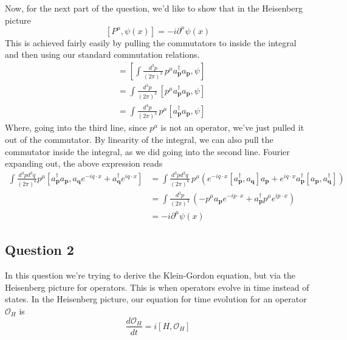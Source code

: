 \documentclass[11pt, oneside]{article}   	%
\theoremstyle{newline}
\theoremstyle{newline}
\theoremstyle{newline}
\theoremstyle{newline}
\theoremstyle{newline}
\begin{document}
Now, for the next part of the question, we'd like to show that in the Heisenberg picture \[ [ P^\mu, \psi(x) ] =  - i \partial^\mu \psi( x) \] 
This is achieved fairly easily by pulling the commutators to inside the integral and then using our standard commutation relations. 
\begin{align*} 
[P^\mu, \psi(x) ] & = [ \int \frac{d^3 p }{ (2 \pi )^3 } \,  p^\mu a_\mathbf{p}^\dagger a_\mathbf{p}, \psi ] \\
&= \int \frac{ d^3 p }{ (2 \pi )^3} \, [ p^\mu a_\mathbf{p}^\dagger a_\mathbf{p} , \psi ] \\ 
&= \int \frac{d^3 p}{ ( 2\pi) ^3 } \, p^\mu [a_\mathbf{p}^\dagger a_\mathbf{p} , \psi ] 
\end {align*} 
Where, going into the third line, since $p^\mu$ is not an operator, we've just pulled it out of the commutator. By linearity of the integral, we can also pull the commutator inside the integral, as we did going into the second line. Fourier expanding out, the above expression reads 
\begin{align*} 
\int \frac{ d^3 p d^3 q }{ ( 2 \pi )^6 } p^\mu [ a_\mathbf{p}^\dagger a_\mathbf{p}, a_\mathbf{q} e^{ - i q \cdot x } + a_\mathbf{q}^\dagger e^{ i q \cdot x } ] &= \int \frac{ d^3 p d^3 q }{ ( 2 \pi ) ^ 6} \, p^\mu \left( e^{ - i q \cdot x } [ a_\mathbf{p}^\dagger, a_\mathbf{q} ] a_\mathbf{p} + e^{ i q \cdot x } a_\mathbf{p}^\dagger [a_\mathbf{p}, a_\mathbf{q}^\dagger ] \right)  \\
&= \int \frac{ d^3 p }{ ( 2 \pi )^ 3} \, \left( - p^\mu a_\mathbf{p} e^ { - i p\cdot x } + a_\mathbf{p}^\dagger p^\mu e^{ i p \cdot x } \right) \\ 
&= - i \partial^\mu \psi(x)  
\end{align*} 


\subsection{Question 2} 
In this question we're trying to derive the Klein-Gordon equation, but via the Heisenberg picture for operators. This is when operators evolve in time instead of states. In the Heisenberg picture, our equation for time evolution for an operator $\mathcal{O}_H$ is 
\[ 
\frac{ d \mathcal{O}_H}{dt}  = i [H, \mathcal{O}_H] 
\] 
\end{document}
